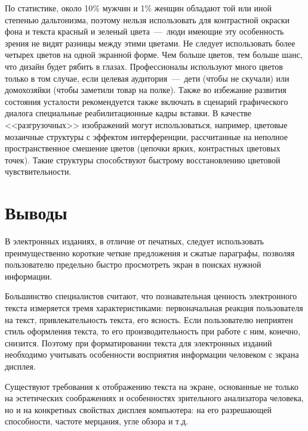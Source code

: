 \documentclass[14pt]{extarticle}
\begin{document}
По статистике, около 10\% мужчин и 1\% женщин обладают той или иной степенью дальтонизма, поэтому нельзя использовать для контрастной окраски фона и текста красный и зеленый цвета~---~люди имеющие эту особенность зрения не видят разницы между этими цветами. Не следует использовать более четырех цветов на одной экранной форме. Чем больше цветов, тем больше шанс, что дизайн будет рябить в глазах. Профессионалы используют много цветов только в том случае, если целевая аудитория~---~дети (чтобы не скучали) или домохозяйки (чтобы заметили товар на полке). Также во избежание развития состояния усталости рекомендуется также включать в сценарий графического диалога специальные реабилитационные кадры вставки. В качестве <<разгрузочных>> изображений могут использоваться, например, цветовые мозаичные структуры с эффектом интерференции, рассчитанные на неполное пространственное смешение цветов (цепочки ярких, контрастных цветовых точек). Такие структуры способствуют быстрому восстановлению цветовой чувствительности.

\section{Выводы}

В электронных изданиях, в отличие от печатных, следует использовать преимущественно короткие четкие предложения и сжатые параграфы, позволяя пользователю предельно быстро просмотреть экран в поисках нужной информации.

Большинство специалистов считают, что познавательная ценность электронного текста измеряется тремя характеристиками: первоначальная реакция пользователя на текст, привлекательность текста, его ясность. Если пользователю неприятен стиль оформления текста, то его производительность при работе с ним, конечно, снизится. Поэтому при форматировании текста для электронных изданий необходимо учитывать особенности восприятия информации человеком с экрана дисплея.

Существуют требования к отображению текста на экране, основанные не только на эстетических соображениях и особенностях зрительного анализатора человека, но и на конкретных свойствах дисплея компьютера: на его разрешающей способности, частоте мерцания, угле обзора и т.д.
\end{document}
